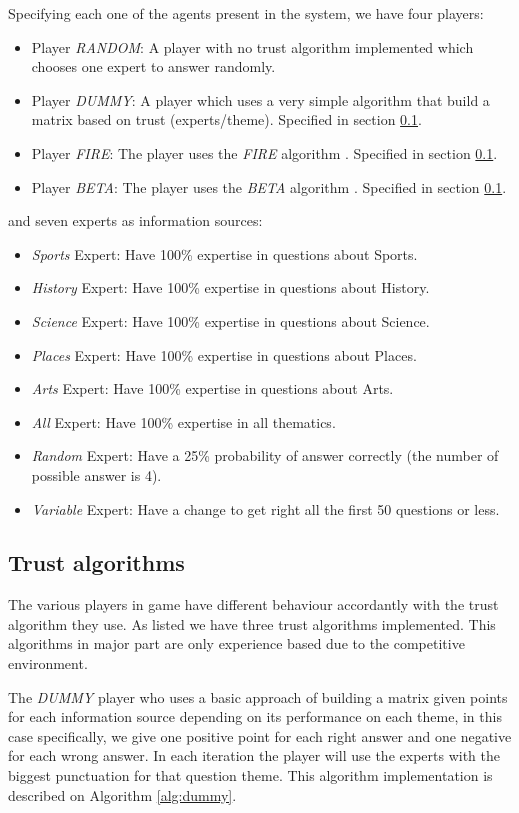 \documentclass{llncs}
\begin{document}
Specifying each one of the agents present in the system, we have four players: 
\begin{itemize}
\item Player \textit{RANDOM}: A player with no trust algorithm implemented which chooses one expert to answer randomly. 
\item Player \textit{DUMMY}: A player which uses a very simple algorithm that build a matrix based on trust (experts/theme). Specified in section \ref{Trust}.
\item Player \textit{FIRE}: The player uses the \textit{FIRE} algorithm \cite{Fire}. Specified in section \ref{Trust}.
\item Player \textit{BETA}: The player uses the \textit{BETA} algorithm \cite{Beta}. Specified in section \ref{Trust}.
\end{itemize}
and seven experts as information sources:
\begin{itemize}
\item \textit{Sports} Expert: Have 100\% expertise in questions about Sports.
\item \textit{History} Expert: Have 100\% expertise in questions about History.
\item \textit{Science} Expert: Have 100\% expertise in questions about Science.
\item \textit{Places} Expert: Have 100\% expertise in questions about Places.
\item \textit{Arts} Expert: Have 100\% expertise in questions about Arts.
\item \textit{All} Expert: Have 100\% expertise in all thematics.
\item \textit{Random} Expert: Have a 25\% probability of answer correctly (the number of possible answer is 4).
\item \textit{Variable} Expert: Have a change to get right all the first 50 questions or less.
\end{itemize}

\subsection{Trust algorithms}\label{Trust}

The various players in game have different behaviour accordantly with the trust algorithm they use. As listed we have three trust algorithms implemented. This algorithms in major part are only experience based due to the competitive environment.

The \textit{DUMMY} player who uses a basic approach of building a matrix given points for each information source depending on its performance on each theme, in this case specifically, we give one positive point for each right answer and one negative for each wrong answer. In each iteration the player will use the experts with the biggest punctuation for that question theme. This algorithm implementation is described on Algorithm \ref{alg:dummy}.
\end{document}
